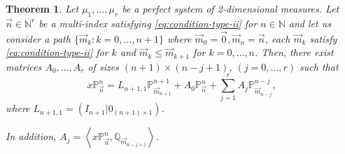 \documentclass[12pt,a4]{article}
\theoremstyle{plain}
\newtheorem{theorem}{Theorem}[section]
\newcommand{\N}[0]{\mathbb{N}}
\newcommand{\prodesc}[2]{\left\langle #1 , #2 \right\rangle}
\begin{document}
\begin{theorem} 
    Let $\mu_1,\dots,\mu_r$ be a perfect system of 2-dimensional measures. Let $\vec n\in \N^r$ be a multi-index satisfying \eqref{eq:condition-type-ii} for $n\in\N$ and let us consider a path $\{\overrightarrow{m}_k:k=0,\dots,n+1\}$ where $\overrightarrow{m}_0=\vec 0, \overrightarrow{m}_n = \vec n$, each $\overrightarrow{m}_k$ satisfy \eqref{eq:condition-type-ii} for $k$ and $\overrightarrow{m}_k \leq \overrightarrow m_{k+1}$ for $k=0,\dots,n$. Then, there exist matrices $A_0,\dots,A_r$ of sizes $(n+1)\times(n-j+1)$,  $(j=0,\dots,r)$ such that
    \begin{equation}
        \label{eq:nearest-neighbor}
        x\mathbb P_{\vec n}^n = L_{{n+1},1} \mathbb P_{\overrightarrow{m}_{n+1}}^{n+1} + A_0 \mathbb P_{\vec n}^n + \sum_{j=1}^r A_j \mathbb P_{\overrightarrow{m}_{n-j}}^{n-j},
    \end{equation}
    where $L_{n+1,1}=(I_{n+1}|0_{(n+1)\times 1})$.

    In addition, $A_j = \prodesc{x\mathbb P_{\vec n}^n}{\mathbb Q_{\overrightarrow{m}_{n-j+1}}}$.
\end{theorem}
\end{document}
